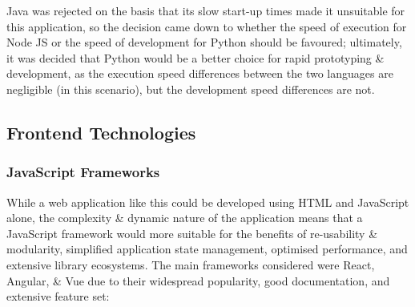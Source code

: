 \documentclass[a4paper,11pt]{report}
\begin{document}
Java was rejected on the basis that its slow start-up times made it unsuitable for this application, so the decision came down to whether the speed of execution for Node JS or the speed of development for Python should be favoured;
ultimately, it was decided that Python would be a better choice for rapid prototyping \& development, as the execution speed differences between the two languages are negligible (in this scenario), but the development speed differences are not.

\subsection{Frontend Technologies}
\subsubsection{JavaScript Frameworks}
While a web application like this could be developed using HTML and JavaScript alone, the complexity \& dynamic nature of the application means that a JavaScript framework would more suitable for the benefits of re-usability \& modularity, simplified application state management, optimised performance, and extensive library ecosystems.
The main frameworks considered were React, Angular, \& Vue due to their widespread popularity, good documentation, and extensive feature set:
\end{document}
